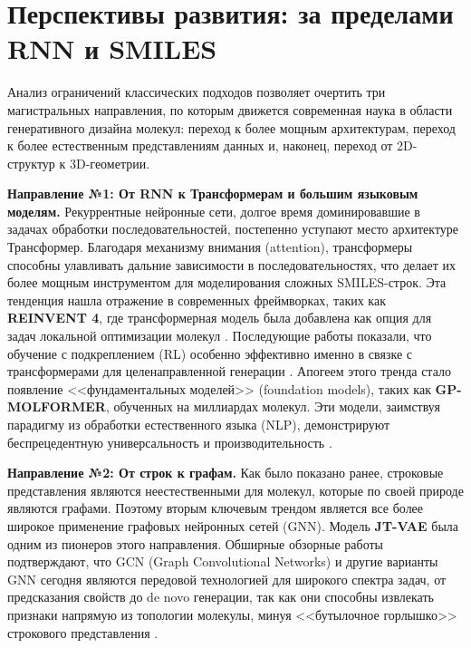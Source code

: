 

\section{Перспективы развития: за пределами RNN и SMILES}
\label{sec:future_perspectives}

Анализ ограничений классических подходов позволяет очертить три магистральных направления, по которым движется современная наука в области генеративного дизайна молекул: переход к более мощным архитектурам, переход к более естественным представлениям данных и, наконец, переход от 2D-структур к 3D-геометрии.

\textbf{Направление №1: От RNN к Трансформерам и большим языковым моделям.}
Рекуррентные нейронные сети, долгое время доминировавшие в задачах обработки последовательностей, постепенно уступают место архитектуре Трансформер. Благодаря механизму внимания (attention), трансформеры способны улавливать дальние зависимости в последовательностях, что делает их более мощным инструментом для моделирования сложных SMILES-строк. Эта тенденция нашла отражение в современных фреймворках, таких как \textbf{REINVENT 4}, где трансформерная модель была добавлена как опция для задач локальной оптимизации молекул \cite{loeffler2024reinvent}. Последующие работы показали, что обучение с подкреплением (RL) особенно эффективно именно в связке с трансформерами для целенаправленной генерации \cite{he2024evaluation}. Апогеем этого тренда стало появление <<фундаментальных моделей>> (foundation models), таких как \textbf{GP-MOLFORMER}, обученных на миллиардах молекул. Эти модели, заимствуя парадигму из обработки естественного языка (NLP), демонстрируют беспрецедентную универсальность и производительность \cite{ross2025gp}.

\textbf{Направление №2: От строк к графам.}
Как было показано ранее, строковые представления являются неестественными для молекул, которые по своей природе являются графами. Поэтому вторым ключевым трендом является все более широкое применение графовых нейронных сетей (GNN). Модель \textbf{JT-VAE} была одним из пионеров этого направления. Обширные обзорные работы подтверждают, что GCN (Graph Convolutional Networks) и другие варианты GNN сегодня являются передовой технологией для широкого спектра задач, от предсказания свойств до de novo генерации, так как они способны извлекать признаки напрямую из топологии молекулы, минуя <<бутылочное горлышко>> строкового представления \cite{sun2020graph}.

